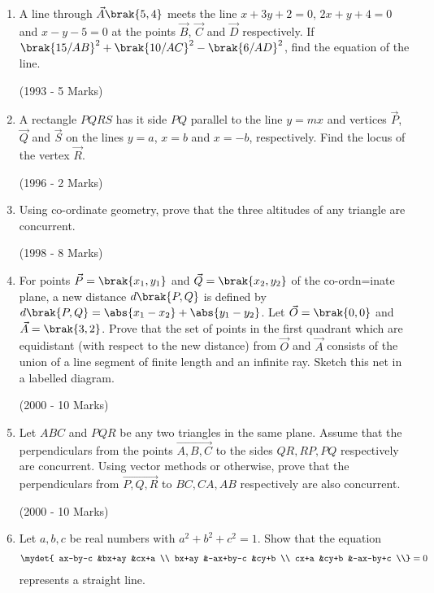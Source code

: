 \begin{enumerate}
\item A line through $\vec{A} \brak{5, 4}$ meets the line $x+3y+2=0$, $2x+y+4=0$ and $x-y-5=0$ at the points $\vec{B}$, $\vec{C}$ and $\vec{D}$ respectively. If $\brak{15/AB}^{2}+\brak{10/AC}^{2}-\brak{6/AD}^{2}$, find the equation of the line.

	\hfill{(1993 - 5 Marks)}

\item A rectangle $PQRS$ has it side $PQ$ parallel to the line $y=mx$ 
	and vertices $\vec{P}$, $\vec{Q}$ and $\vec{S}$ on the lines $y=a$, $x=b$ and $x=-b$, 
		respectively. Find the locus of the vertex $\vec{R}$.
	
		\hfill{(1996 - 2 Marks)}

\item Using co-ordinate geometry, prove that the three altitudes of any triangle are concurrent.

	\hfill{(1998 - 8 Marks)}

\item For points $\vec{P}=\brak{x_{1}, y_{1}}$ and $\vec{Q}=\brak{x_{2}, y_{2}}$ of the co-ordn=inate plane, a new distance $d\brak{P, Q}$ is defined by $d\brak{P, Q}=\abs{x_{1}-x_{2}}+\abs{y_{1}-y_{2}}$. Let $\vec{O}=\brak{0, 0}$ and $\vec{A}=\brak{3, 2}$. Prove that the set of points in the first quadrant which are equidistant (with respect to the new distance) from $\vec{O}$ and $\vec{A}$ consists of the union of a line segment of finite length and an infinite ray. Sketch this net in a labelled diagram.

	\hfill{(2000 - 10 Marks)}

\item Let $ABC$ and $PQR$ be any two triangles in the same plane.
	Assume that the perpendiculars from the points $\vec{A, B, C}$ to 
		the sides $QR, RP, PQ$ respectively are concurrent. Using vector methods or otherwise, prove that the perpendiculars from $\vec{P, Q, R}$ to $BC, CA, AB$ respectively are also concurrent. 

	\hfill{(2000 - 10 Marks)}

\item Let $a, b, c$ be real numbers with $a^{2}+b^{2}+c^{2}=1$. Show that the equation 
	\begin{align}
		\mydet{
ax-by-c     &bx+ay       &cx+a      \\
bx+ay       &-ax+by-c   &cy+b       \\
cx+a         &cy+b         &-ax-by+c \\} =0
	\end{align}
represents a straight line.


\end{enumerate}
